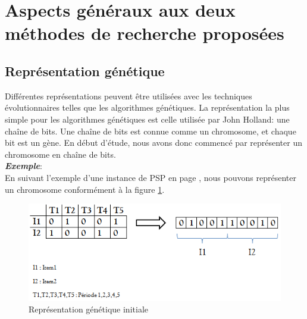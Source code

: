 \documentclass[12pt,a4paper]{article}
\begin{document}
	\section{Aspects généraux aux deux méthodes de recherche proposées}
	\subsection{Représentation génétique}
	Différentes représentations peuvent être utilisées avec les techniques évolutionnaires telles que les algorithmes génétiques. La représentation la plus simple pour les algorithmes génétiques est celle utilisée par John Holland: une chaîne de bits. Une chaîne de bits est connue comme un chromosome, et chaque bit est un gène. En début d'étude, nous avons donc commencé par représenter un chromosome en chaîne de bits. \\
	\textsl{\textbf{Exemple}}:\\
	\hspace*{.5cm} En suivant l'exemple d'une instance de PSP en page \pageref{sec:problem_description}, nous pouvons représenter un chromosome conformément à la figure \ref{fig:init_gene_repr}.
	
	\begin{figure}[h]
		\begin{center}
			\includegraphics[scale=.5]{img/init_gene_repr.png}
			\caption{Représentation génétique initiale}
			\label{fig:init_gene_repr}
		\end{center}
	\end{figure}
	
\end{document}
